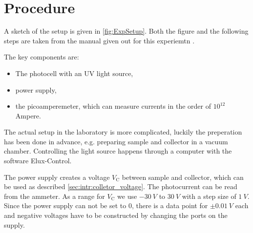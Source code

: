 \section{Procedure}
\label{sec:procedure}
A sketch of the setup is given in \autoref{fig:ExpSetup}. Both the figure and the following steps
are taken from the manual given out for this experiemtn \cite{LabInstructions}. 

The key components are:
\begin{itemize}
  \item The photocell with an UV light source,
  \item power supply,
  \item the picoamperemeter, which can measure currents in the order of $10^{12}$ Ampere.
\end{itemize}
The actual setup in the laboratory is more complicated, luckily the preperation has been done in
advance, e.g. preparing sample and collector in a vacuum chamber. Controlling the light source
happens through a computer with the software Elux-Control.

The power supply creates a voltage $V_\text{C}$ between sample and collector, which can be used as
described \autoref{sec:intr:colletor_voltage}. 
The photocurrent can be read from the ammeter. As a range for $V_\text{C}$ we
use $\SI{-30}{V}$ to $\SI{30}{V}$ with a step size of $\SI{1}{V}$. Since the power supply can not be
set to 0, there is a data point for $\pm \SI{0.01}{V}$ each and negative voltages have to be
constructed by changing the ports on the supply.

